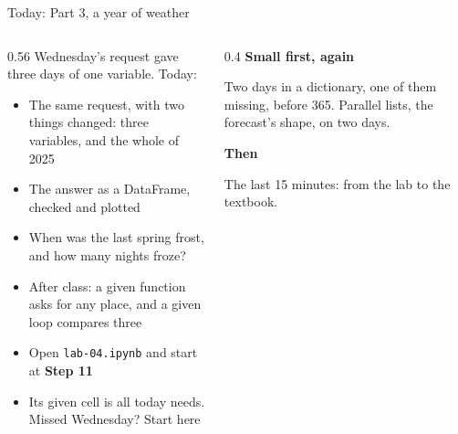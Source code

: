 \documentclass[9pt,aspectratio=169]{beamer}
\begin{document}
\begin{frame}{Today: Part 3, a year of weather}
    \begin{columns}[T]
        \begin{column}{0.56\textwidth}
            Wednesday's request gave three days of one variable. Today:
            \begin{itemize}\small
                \item The same request, with two things changed: three variables, and the whole of 2025
                \item The answer as a DataFrame, checked and plotted
                \item When was the last spring frost, and how many nights froze?
                \item After class: a given function asks for any place, and a given loop compares three
            \end{itemize}

            \medskip
            \begin{itemize}\small
                \item Open \texttt{lab-04.ipynb} and start at \textbf{Step 11}
                \item Its given cell is all today needs. Missed Wednesday? Start here
            \end{itemize}
        \end{column}
        \begin{column}{0.4\textwidth}
            \textbf{Small first, again}\\[2pt]
            {\footnotesize Two days in a dictionary, one of them missing, before 365. Parallel lists, the forecast's shape, on two days.\par}
            \medskip
            \textbf{Then}\\[2pt]
            {\footnotesize The last 15 minutes: from the lab to the textbook.\par}
        \end{column}
    \end{columns}
\end{frame}
\end{document}
